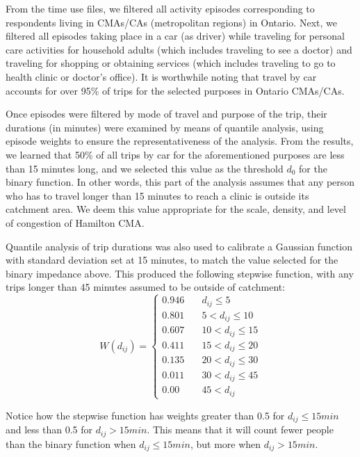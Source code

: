 \documentclass[10pt,letterpaper]{article}
\begin{document}
From the time use files, we filtered all activity episodes corresponding
to respondents living in CMAs/CAs (metropolitan regions) in Ontario.
Next, we filtered all episodes taking place in a car (as driver) while
traveling for personal care activities for household adults (which
includes traveling to see a doctor) and traveling for shopping or
obtaining services (which includes traveling to go to health clinic or
doctor's office). It is worthwhile noting that travel by car accounts
for over 95\% of trips for the selected purposes in Ontario CMAs/CAs.

Once episodes were filtered by mode of travel and purpose of the trip,
their durations (in minutes) were examined by means of quantile
analysis, using episode weights to ensure the representativeness of the
analysis. From the results, we learned that 50\% of all trips by car for
the aforementioned purposes are less than 15 minutes long, and we
selected this value as the threshold \(d_0\) for the binary function. In
other words, this part of the analysis assumes that any person who has
to travel longer than 15 minutes to reach a clinic is outside its
catchment area. We deem this value appropriate for the scale, density,
and level of congestion of Hamilton CMA.

Quantile analysis of trip durations was also used to calibrate a
Gaussian function with standard deviation set at 15 minutes, to match
the value selected for the binary impedance above. This produced the
following stepwise function, with any trips longer than 45 minutes
assumed to be outside of catchment: \[
W(d_{ij}) = \left\{
        \begin{array}{ll}
            0.946 & \quad d_{ij} \leq 5 \\
            0.801 & \quad 5 < d_{ij} \leq 10 \\
            0.607 & \quad 10 < d_{ij} \leq 15 \\
            0.411 & \quad 15 < d_{ij} \leq 20 \\
            0.135 & \quad 20 < d_{ij} \leq 30 \\
            0.011 & \quad 30 < d_{ij} \leq 45 \\
            0.00 & \quad 45 < d_{ij}
        \end{array}
    \right.
\]

Notice how the stepwise function has weights greater than 0.5 for
\(d_{ij} \leq 15 min\) and less than 0.5 for \(d_{ij} > 15 min\). This
means that it will count fewer people than the binary function when
\(d_{ij} \leq 15 min\), but more when \(d_{ij} > 15 min\).
\end{document}
